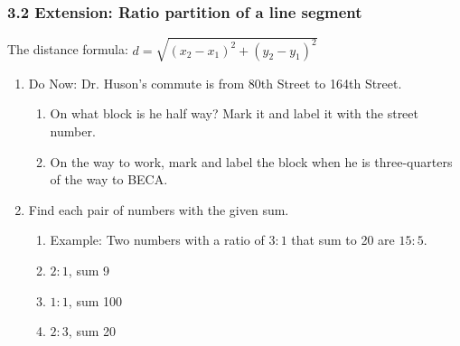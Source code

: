 

\fancyhead[LE]{\thepage}



\subsubsection*{3.2 Extension: Ratio partition of a line segment}
The distance formula: $\displaystyle d=\sqrt{(x_2-x_1)^2+(y_2-y_1)^2}$
\begin{enumerate}
\item Do Now: Dr. Huson's commute is from 80th Street to 164th Street. 
\begin{enumerate}
    \item On what block is he half way? Mark it and label it with the street number.
    \item On the way to work, mark and label the block when he is three-quarters of the way to BECA.
\end{enumerate}
    \vspace{5cm}


\item Find each pair of numbers with the given sum.
\begin{enumerate}
    \item Example: Two numbers with a ratio of $3:1$ that sum to 20 are $15:5$.
    \item $2:1$, sum 9 \vspace{1cm}
    \item $1:1$, sum 100 \vspace{1cm}
    \item $2:3$, sum 20 \vspace{1cm}
\end{enumerate}


\end{enumerate}
